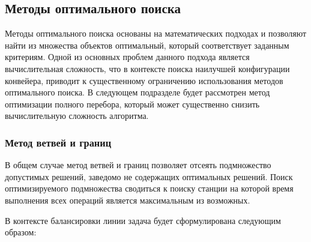 \subsection{Методы оптимального поиска}
Методы оптимального поиска основаны на математических подходах и позволяют найти из множества объектов оптимальный, который соответствует заданным критериям. Одной из основных проблем данного подхода является вычислительная сложность, что в контексте поиска наилучшей конфигурации конвейера, приводит к существенному ограничению использования методов оптимального поиска. В следующем подразделе будет рассмотрен метод оптимизации полного перебора, который может существенно снизить вычислительную сложность алгоритма.

\subsubsection{Метод ветвей и границ}
В общем случае метод ветвей и границ позволяет отсеять подмножество допустимых решений, заведомо не содержащих оптимальных решений. Поиск оптимизируемого подмножества сводиться к поиску станции на которой время выполнения всех операций является максимальным из возможных.

В контексте балансировки линии задача будет сформулирована следующим образом:

